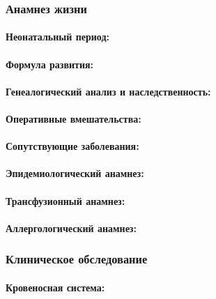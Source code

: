 \documentclass[a4paper,14pt]{extarticle}
\begin{document}
\subsubsection*{Анамнез жизни}

\paragraph{Неонатальный период:}

\paragraph{Формула развития:}

\paragraph{Генеалогический анализ и наследственность:}

\paragraph{Оперативные вмешательства:}

\paragraph{Сопутствующие заболевания:}

\paragraph{Эпидемиологический анамнез:}

\paragraph{Трансфузионный анамнез:}

\paragraph{Аллергологический анамнез:}

\subsubsection*{Клиническое обследование}

\paragraph{Кровеносная система:}
\end{document}
